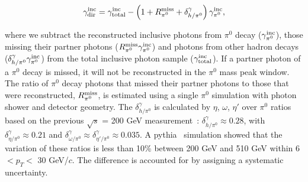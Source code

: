\documentclass[twocolumn,letterpaper,aps,prl,longbibliography,superscriptaddress,floatfix]{revtex4-2}
\newcommand{\pizero}{\mbox{$\pi^0$}\xspace}
\begin{document}
\begin{equation} \label{eq:inc}
\gamma_{{\rm dir}}^{{\rm inc}} = \gamma_{{\rm total}}^{{\rm inc}} - \left( 1 + R_{\pi^0}^{{\rm miss}} + \delta_{h/\pi^0}^{\gamma} \right) \gamma_{\pi^0}^{{\rm inc}},
\end{equation}

where we subtract the reconstructed inclusive photons from \pizero decay 
($\gamma_{\pi^0}^{{\rm inc}}$), those missing their partner photons 
($R_{\pi^0}^{{\rm miss}}\gamma_{\pi^0}^{{\rm inc}}$) and photons from 
other hadron decays 
($\delta_{h/\pi^0}^{\gamma}\gamma_{\pi^0}^{{\rm inc}}$) from the total 
inclusive photon sample ($\gamma_{{\rm total}}^{{\rm inc}}$). If a 
partner photon of a \pizero decay is missed, it will not be 
reconstructed in the \pizero mass peak window. The ratio of \pizero 
decay photons that missed their partner photons to those that were 
reconstructed, $R_{\pi^0}^{{\rm miss}}$, is estimated using a single 
\pizero simulation with photon shower and detector geometry. 
The $\delta_{h/\pi^0}^{\gamma}$ is calculated by $\eta$, $\omega$, $\eta'$ 
over \pizero ratios based on the previous $\sqrt{s}$ = 200 GeV 
measurement~\cite{PhysRevD.83.052004}: 
$\delta_{h/\pi^0}^{\gamma}{\approx}0.28$, with 
$\delta_{\eta/\pi^0}^{\gamma}{\approx}0.21$ and 
$\delta_{\omega/\pi^0}^{\gamma}{\approx}\delta_{\eta'/\pi^0}^{\gamma}{\approx}0.035$. 
A {\sc pythia}~\cite{Sjostrand:2006za} simulation showed that 
the variation of these ratios is less than 10\% between 200 GeV and 510 
GeV within 6 $< p_T <$ 30 GeV/$c$. The difference is accounted for by 
assigning a systematic uncertainty.
\end{document}
